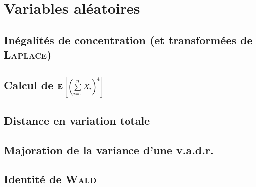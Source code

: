 \chapter{Variables aléatoires}

\section{Inégalités de concentration (et transformées de \textsc{Laplace})}


\section{Calcul de \texorpdfstring{$\mathbf{E} \left [ \left (\sum\limits_{i=1}^{n} X_i \right)^4 \right]$}{espérance de la somme puissance 4 de v.a.}}


\section{Distance en variation totale}


\section{Majoration de la variance d'une v.a.d.r.}


\section{Identité de \textsc{Wald}}


\newpage


